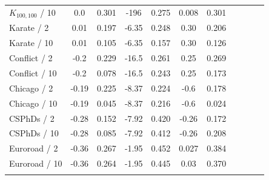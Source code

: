 \documentclass{article} %
\begin{document}
\begin{table}[t]
\begin{center}
\begin{tabular}{lcccccccccc}
$K_{100,100}$ / 10 &
0.0 & 0.301 & 
-196 & 0.275 & 
0.008 & 0.301 & 
& \\
Karate / 2 &
0.01 & 0.197 & 
-6.35 & 0.248 &
0.30 & 0.206 &
& \\
Karate / 10 &
0.01 & 0.105 & 
-6.35 & 0.157 &
0.30 & 0.126 &
& \\
Conflict / 2 &
-0.2 &	0.229 &
-16.5 &	0.261 &
0.25 & 	0.269 &
& \\
Conflict / 10 &
-0.2 & 0.078 &
-16.5 &	0.243 &
0.25 &	0.173 &
& \\
Chicago / 2 &
-0.19 & 0.225 & 
-8.37 & 0.224 & 
-0.6 & 0.178 & 
& \\
Chicago / 10 &
-0.19 & 0.045 & 
-8.37 & 0.216 & 
-0.6 & 0.024 & 
& \\
CSPhDs / 2 &
-0.28 &	0.152 &
-7.92 &	0.420 &
-0.26 & 0.172 &
& \\
CSPhDs / 10 &
-0.28 &	0.085 &
-7.92 &	0.412 &
-0.26 & 0.208 &
& \\
Euroroad / 2 &
-0.36 &	0.267 &
-1.95 &	0.452&
0.027 &	0.384&
& \\
Euroroad / 10 &
-0.36 &	0.264 &
-1.95 &	0.445 &
0.03 &	0.370 &
& \\
\hline \\
\end{tabular}
\end{center}
\end{table}
\end{document}

